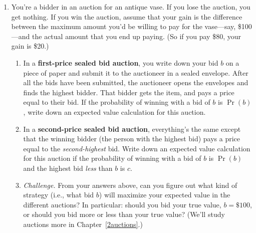 \begin{enumerate}
\item You're a bidder in an auction for an antique vase. If you lose the auction, you get nothing. If you win the auction, assume that your gain is the difference between the maximum amount you'd be willing to pay for the vase---say, \$100---and the actual amount that you end up paying. (So if you pay \$80, your gain is \$20.)

    \begin{enumerate}

    \item In a \textbf{first-price sealed bid auction}, you write down your bid $b$ on a piece of paper and submit it to the auctioneer in a sealed envelope. After all the bids have been submitted, the auctioneer opens the envelopes and finds the highest bidder. That bidder gets the item, and pays a price equal to their bid. If the probability of winning with a bid of $b$ is $\Pr(b)$, write down an expected value calculation for this auction.%


    \item In a \textbf{second-price sealed bid auction}, everything's the same except that the winning bidder (the person with the highest bid) pays a price equal to the \emph{second-highest} bid. Write down an expected value calculation for this auction if the probability of winning with a bid of $b$ is $\Pr(b)$ and the highest bid \emph{less} than $b$ is $c$.


   \item \emph{Challenge.} From your answers above, can you figure out what kind of strategy (i.e., what bid $b$) will maximize your expected value in the different auctions? In particular: should you bid your true value, $b=\$100$, or should you bid more or less than your true value? (We'll study auctions more in Chapter~\ref{2auctions}.)
    \end{enumerate}












\end{enumerate}
